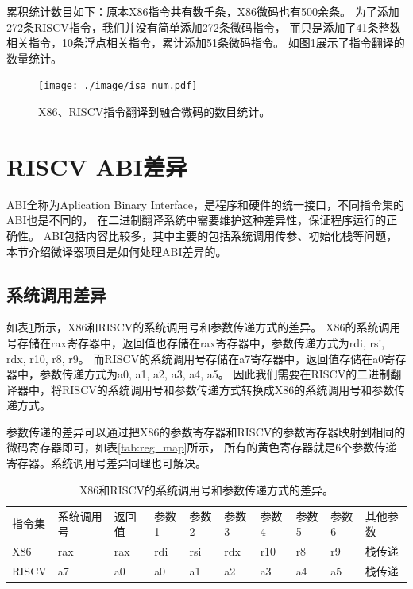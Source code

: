累积统计数目如下：原本X86指令共有数千条，X86微码也有500余条。
为了添加272条RISCV指令，我们并没有简单添加272条微码指令，
而只是添加了41条整数相关指令，10条浮点相关指令，累计添加51条微码指令。
如图\ref{img:isa_num}展示了指令翻译的数量统计。


\begin{figure}[!htbp]
  \centering
  \texttt{[image: ./image/isa\_num.pdf]}
  \caption{X86、RISCV指令翻译到融合微码的数目统计。}
  \label{img:isa_num}
\end{figure}



\section{RISCV ABI差异}
ABI全称为Aplication Binary Interface，是程序和硬件的统一接口，不同指令集的ABI也是不同的，
在二进制翻译系统中需要维护这种差异性，保证程序运行的正确性。
ABI包括内容比较多，其中主要的包括系统调用传参、初始化栈等问题，本节介绍微译器项目是如何处理ABI差异的。


\subsection{系统调用差异}

如表\ref{tab:syscall}所示，X86和RISCV的系统调用号和参数传递方式的差异。
X86的系统调用号存储在rax寄存器中，返回值也存储在rax寄存器中，参数传递方式为rdi, rsi, rdx, r10, r8, r9。
而RISCV的系统调用号存储在a7寄存器中，返回值存储在a0寄存器中，参数传递方式为a0, a1, a2, a3, a4, a5。
因此我们需要在RISCV的二进制翻译器中，将RISCV的系统调用号和参数传递方式转换成X86的系统调用号和参数传递方式。

参数传递的差异可以通过把X86的参数寄存器和RISCV的参数寄存器映射到相同的微码寄存器即可，如表\ref{tab:reg_map}所示，
所有的黄色寄存器就是6个参数传递寄存器。系统调用号差异同理也可解决。



\begin{table}[h]
    \centering
    \begin{adjustbox}{width=\textwidth}
      \begin{tabular}{llllllllll}
      \rowcolor[HTML]{FFCC67} 
      \cellcolor[HTML]{FBE5D6}指令集 & \cellcolor[HTML]{FBE5D6}系统调用号 & \cellcolor[HTML]{FBE5D6}返回值 & 参数1 & 参数2 & 参数3 & 参数4 & 参数5 & 参数6 & 其他参数 \\
      X86                         & rax                           & rax                         & rdi & rsi & rdx & r10 & r8  & r9  & 栈传递  \\
      RISCV                       & a7                            & a0                          & a0  & a1  & a2  & a3  & a4  & a5  & 栈传递 
      \end{tabular}
    \end{adjustbox}
    \caption{X86和RISCV的系统调用号和参数传递方式的差异。}
    \label{tab:syscall}
  \end{table}
  

